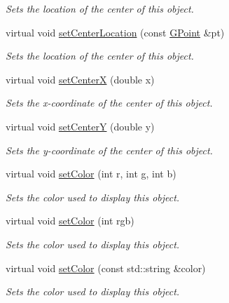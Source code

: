 \begin{DoxyCompactItemize}
\begin{DoxyCompactList}\small\item\em Sets the location of the center of this object. \end{DoxyCompactList}\item 
virtual void \mbox{\hyperlink{classGObject_a1bedf1b233ecba3f753ec58908a683a6}{set\+Center\+Location}} (const \mbox{\hyperlink{classGPoint}{G\+Point}} \&pt)
\begin{DoxyCompactList}\small\item\em Sets the location of the center of this object. \end{DoxyCompactList}\item 
virtual void \mbox{\hyperlink{classGObject_a2f4936281e056eead00a9186b9ba8af6}{set\+CenterX}} (double x)
\begin{DoxyCompactList}\small\item\em Sets the x-\/coordinate of the center of this object. \end{DoxyCompactList}\item 
virtual void \mbox{\hyperlink{classGObject_aad2a22b4fde88c33306b92aebf641d57}{set\+CenterY}} (double y)
\begin{DoxyCompactList}\small\item\em Sets the y-\/coordinate of the center of this object. \end{DoxyCompactList}\item 
virtual void \mbox{\hyperlink{classGObject_ad57ef49bc31db94e92648aa3737923d6}{set\+Color}} (int r, int g, int b)
\begin{DoxyCompactList}\small\item\em Sets the color used to display this object. \end{DoxyCompactList}\item 
virtual void \mbox{\hyperlink{classGObject_ab1f5cc0f5cc6bbbd716a526c61f1081d}{set\+Color}} (int rgb)
\begin{DoxyCompactList}\small\item\em Sets the color used to display this object. \end{DoxyCompactList}\item 
virtual void \mbox{\hyperlink{classGObject_a61374df6c11b52cfbb0815decdbaebc6}{set\+Color}} (const std\+::string \&color)
\begin{DoxyCompactList}\small\item\em Sets the color used to display this object. \end{DoxyCompactList}\item 

\end{DoxyCompactItemize}
